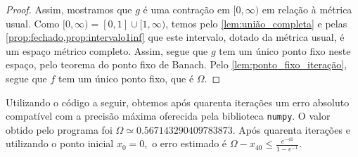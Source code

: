 \begin{proof}
    Assim, mostramos que \(g\) é uma contração em \([0, \infty)\) em relação à métrica usual. Como \([0, \infty) = [0,1]\cup[1, \infty)\), temos pelo \cref{lem:união_completa} e pelas \cref{prop:fechado,prop:intervalo1inf} que este intervalo, dotado da métrica usual, é um espaço métrico completo. Assim, segue que \(g\) tem um único ponto fixo neste espaço, pelo teorema do ponto fixo de Banach. Pelo \cref{lem:ponto_fixo_iteração}, segue que \(f\) tem um único ponto fixo, que é \(\Omega\).
\end{proof}

Utilizando o código a seguir, obtemos após quarenta iterações um erro absoluto compatível com a precisão máxima oferecida pela biblioteca \verb|numpy|. O valor obtido pelo programa foi \(\Omega \simeq0.567143290409783873\). Após quarenta iterações e utilizando o ponto inicial \(x_0 = 0,\) o erro estimado é \(\Omega - x_{40} \leq \frac{e^{-41}}{1 - e^{-1}}.\)
\begin{listing}[htbp]
    \inputminted[linenos]{Python}{exercício10.py}
\end{listing}
